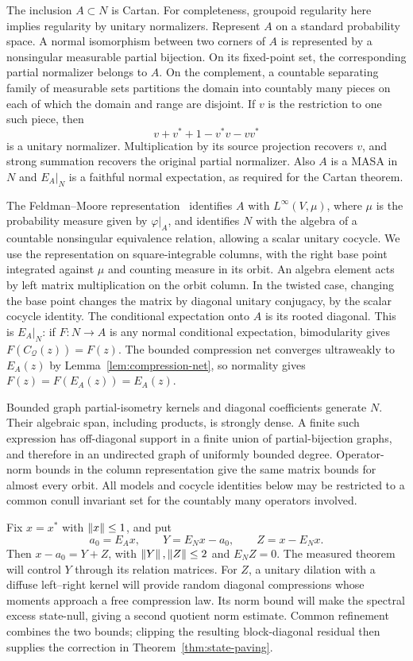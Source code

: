 The inclusion $A\subset N$ is Cartan. For completeness, groupoid
regularity here implies regularity by unitary normalizers. Represent $A$
on a standard probability space. A normal isomorphism between two
corners of $A$ is represented by a nonsingular measurable partial
bijection. On its fixed-point set, the corresponding partial normalizer
belongs to $A$. On the complement, a countable separating family of
measurable sets partitions the domain into countably many pieces on each
of which the domain and range are disjoint. If $v$ is the restriction to
one such piece, then
\[
 v+v^*+1-v^*v-vv^*
\]
is a unitary normalizer. Multiplication by its source projection recovers
$v$, and strong summation recovers the original partial normalizer.
Also $A$ is a MASA in $N$ and $E_A|_N$ is a faithful normal expectation,
as required for the Cartan theorem.

The Feldman--Moore representation~\cite{FM77} identifies $A$ with
$L^\infty(V,\mu)$, where $\mu$ is the probability measure given by
$\varphi|_A$, and identifies $N$ with the algebra of a countable
nonsingular equivalence relation, allowing a scalar unitary cocycle.
We use the representation on square-integrable columns, with the right
base point integrated against $\mu$ and counting measure in its orbit.
An algebra element acts by left matrix multiplication on the orbit
column. In the twisted case, changing the base point changes the matrix
by diagonal unitary conjugacy, by the scalar cocycle identity. The
conditional expectation onto $A$ is its rooted diagonal. This is
$E_A|_N$: if $F:N\to A$ is any normal conditional expectation,
bimodularity gives $F(C_{\mathcal Q}(z))=F(z)$. The bounded
compression net converges ultraweakly to $E_A(z)$ by
Lemma~\ref{lem:compression-net}, so normality gives
$F(z)=F(E_A(z))=E_A(z)$.

Bounded graph partial-isometry kernels and diagonal coefficients generate
$N$. Their algebraic span, including products, is strongly dense. A
finite such expression has off-diagonal support in a finite union of
partial-bijection graphs, and therefore in an undirected graph of
uniformly bounded degree. Operator-norm bounds in the column
representation give the same matrix bounds for almost every orbit. All
models and cocycle identities below may be restricted to a common
conull invariant set for the countably many operators involved.

Fix $x=x^*$ with $\left\lVert x\right\rVert\leq1$, and put
\begin{equation}\label{exp:decomposition}
 a_0=E_Ax,\qquad Y=E_Nx-a_0,\qquad Z=x-E_Nx.
\end{equation}
Then $x-a_0=Y+Z$, with $\left\lVert Y\right\rVert,\left\lVert Z\right\rVert\leq2$ and $E_NZ=0$.
The measured theorem will control $Y$ through its relation matrices.
For $Z$, a unitary dilation with a diffuse left--right kernel will provide
random diagonal compressions whose moments approach a free compression law. Its norm
bound will make the spectral excess state-null, giving a second
quotient norm estimate. Common refinement combines the two bounds;
clipping the resulting block-diagonal residual then supplies the
correction in Theorem~\ref{thm:state-paving}.

